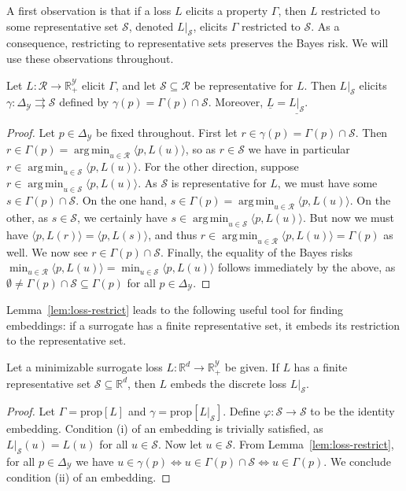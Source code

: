 \documentclass[twoside,11pt]{article}
\newcommand{\reals}{\mathbb{R}}
\newcommand{\prop}[1]{\mathrm{prop}[#1]}
\newcommand{\simplex}{\Delta_\Y}
\newcommand{\R}{\mathcal{R}}
\newcommand{\Sc}{\mathcal{S}}
\newcommand{\Y}{\mathcal{Y}}
\newcommand{\risk}[1]{\underline{#1}}
\newcommand{\inprod}[2]{\langle #1, #2 \rangle}%
\newcommand{\toto}{\rightrightarrows}
\DeclareMathOperator*{\argmin}{arg\,min}
\begin{document}
A first observation is that if a loss $L$ elicits a property $\Gamma$, then $L$ restricted to some representative set $\Sc$, denoted $L|_\Sc$, elicits $\Gamma$ restricted to $\Sc$.
As a consequence, restricting to representative sets preserves the Bayes risk.
We will use these observations throughout.
\begin{lemma}\label{lem:loss-restrict}
  Let $L:\R\to\reals^\Y_+$ elicit $\Gamma$, and let $\Sc\subseteq\R$ be representative for $L$.
  Then $L|_\Sc$ elicits $\gamma:\simplex\toto\Sc$ defined by $\gamma(p) = \Gamma(p)\cap \Sc$.
  Moreover, $\risk{L}=\risk{L|_\Sc}$.
\end{lemma}
\begin{proof}
  Let $p\in\simplex$ be fixed throughout.
  First let $r \in \gamma(p) = \Gamma(p) \cap \Sc$.
  Then $r \in \Gamma(p) = \argmin_{u\in\R} \inprod{p}{L(u)}$, so as $r\in\Sc$ we have in particular $r \in \argmin_{u\in\Sc} \inprod{p}{L(u)}$.
  For the other direction, suppose $r \in \argmin_{u\in\Sc} \inprod{p}{L(u)}$.
  As $\Sc$ is representative for $L$, we must have some $s \in \Gamma(p) \cap \Sc$.
  On the one hand, $s\in\Gamma(p) = \argmin_{u\in\R} \inprod{p}{L(u)}$.
  On the other, as $s \in \Sc$, we certainly have $s \in \argmin_{u\in\Sc} \inprod{p}{L(u)}$.
  But now we must have $\inprod{p}{L(r)} = \inprod{p}{L(s)}$, and thus $r \in \argmin_{u\in\R} \inprod{p}{L(u)} = \Gamma(p)$ as well.
  We now see $r \in \Gamma(p) \cap \Sc$.
  Finally, the equality of the Bayes risks $\min_{u\in\R} \inprod{p}{L(u)} = \min_{u\in\Sc} \inprod{p}{L(u)}$ follows immediately by the above, as $\emptyset \neq \Gamma(p)\cap\Sc \subseteq \Gamma(p)$ for all $p\in\simplex$.
\end{proof}


Lemma~\ref{lem:loss-restrict} leads to the following useful tool for finding embeddings: if a surrogate has a finite representative set, it embeds its restriction to the representative set.
\begin{proposition}\label{prop:representative-embeds-restriction}
  Let a minimizable surrogate loss $L:\reals^d \to \reals^\Y_+$ be given.
  If $L$ has a finite representative set $\Sc \subseteq \reals^d$, then $L$ embeds the discrete loss $L|_\Sc$.
\end{proposition}
\begin{proof}
  Let $\Gamma = \prop{L}$ and $\gamma = \prop{L|_\Sc}$.
  Define $\varphi : \Sc \to \Sc$ to be the identity embedding.
  Condition (i) of an embedding is trivially satisfied, as $L|_\Sc(u) = L(u)$ for all $u\in\Sc$.
  Now let $u\in\Sc$.
  From Lemma~\ref{lem:loss-restrict}, for all $p\in\simplex$ we have $u \in \gamma(p) \iff u \in \Gamma(p) \cap \Sc \iff u \in \Gamma(p)$.
  We conclude condition (ii) of an embedding.
\end{proof}
\end{document}
